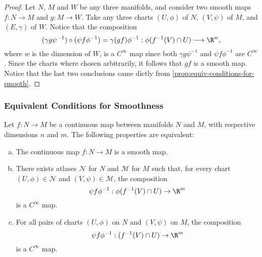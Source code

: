 \begin{proof}
Let \(N\), \(M\) and \(W\) be any three manifolds, and consider two smooth maps
\(f: N \to M\) and \(g: M \to W\). Take any three charts \((U, \phi)\) of \(N\),
\((V, \psi)\) of \(M\), and \((E, \gamma)\) of \(W\). Notice that the
composition
\[
(\gamma g \psi^{-1}) \circ (\psi f \phi^{-1})
= \gamma (g f) \phi^{-1}: \phi(f^{-1}(V) \cap U)
\longrightarrow \R^w,
\]
where \(w\) is the dimension of \(W\), is a \(C^{\infty}\) map since both
\(\gamma g \psi^{-1}\) and \(\psi f \phi^{-1}\) are \(C^{\infty}\). Since the
charts where chosen arbitrarily, it follows that \(g f\) is a smooth map. Notice
that the last two conclusions came dictly from
\cref{prop:equiv-conditions-for-smooth}.
\end{proof}

\subsubsection{Equivalent Conditions for Smoothness}

\begin{proposition}
\label{prop:equiv-conditions-for-smooth}
Let \(f: N \to M\) be a continuous map between manifolds \(N\) and \(M\), with
respective dimensions \(n\) and \(m\). The following properties are equivalent:
\begin{enumerate}[(a)]\setlength\itemsep{0em}
\item The continuous map \(f: N \to M\) is a smooth map.

\item There exists atlases \(\mathcal{N}\) for \(N\) and \(\mathcal{M}\) for
  \(M\) such that, for every chart \((U, \phi) \in \mathcal{N}\) and
  \((V, \psi) \in \mathcal{M}\), the composition
  \[
  \psi f \phi^{-1}: \phi(f^{-1}(V) \cap U) \to \R^m
  \]
  is a \(C^{\infty}\) map.

\item For all pairs of charts \((U, \phi)\) on \(N\) and \((V, \psi)\) on \(M\),
  the composition
  \[
  \psi f \phi^{-1}: (f^{-1}(V) \cap U) \to  \R^m
  \]
  is a \(C^{\infty}\) map.
\end{enumerate}
\end{proposition}

